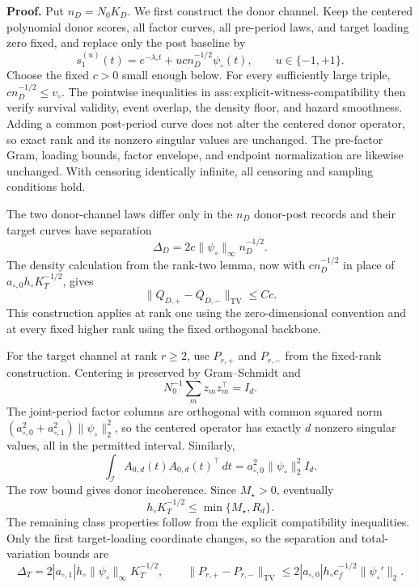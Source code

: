 \textbf{Proof.}
Put \(n_D=N_0K_D\).  We first construct the donor channel.  Keep the centered polynomial donor scores, all factor curves, all pre-period laws, and target loading zero fixed, and replace only the post baseline by
\[
 s_1^{(u)}(t)=e^{-\lambda_\circ t}+ucn_D^{-1/2}\psi_\circ(t),\qquad u\in\{-1,+1\}.
\]
Choose the fixed \(c>0\) small enough below.  For every sufficiently large triple, \(cn_D^{-1/2}\le v_\circ\).  The pointwise inequalities in \(\mathrm{ass:explicit\mbox{-}witness\mbox{-}compatibility}\) then verify survival validity, event overlap, the density floor, and hazard smoothness.  Adding a common post-period curve does not alter the centered donor operator, so exact rank and its nonzero singular values are unchanged.  The pre-factor Gram, loading bounds, factor envelope, and endpoint normalization are likewise unchanged.  With censoring identically infinite, all censoring and sampling conditions hold.

The two donor-channel laws differ only in the \(n_D\) donor-post records and their target curves have separation
\[
 \Delta_D=2c\|\psi_\circ\|_\infty n_D^{-1/2}.
\]
The density calculation from the rank-two lemma, now with \(c n_D^{-1/2}\) in place of \(a_{\circ,0}h_\circ K_T^{-1/2}\), gives
\[
 \|Q_{D,+}-Q_{D,-}\|_{\mathrm{TV}}\le Cc.
\]
This construction applies at rank one using the zero-dimensional convention and at every fixed higher rank using the fixed orthogonal backbone.

For the target channel at rank \(r\ge2\), use \(P_{r,+}\) and \(P_{r,-}\) from the fixed-rank construction.  Centering is preserved by Gram--Schmidt and
\[
 N_0^{-1}\sum_mz_mz_m^\top=I_d.
\]
The joint-period factor columns are orthogonal with common squared norm \((a_{\circ,0}^2+a_{\circ,1}^2)\|\psi_\circ\|_2^2\), so the centered operator has exactly \(d\) nonzero singular values, all in the permitted interval.  Similarly,
\[
 \int_{\mathcal I}A_{0,d}(t)A_{0,d}(t)^\top\,dt
 =a_{\circ,0}^2\|\psi_\circ\|_2^2I_d.
\]
The row bound gives donor incoherence.  Since \(M_\star>0\), eventually
\[
 h_\circ K_T^{-1/2}\le\min\{M_\star,R_d\}.
\]
The remaining class properties follow from the explicit compatibility inequalities.  Only the first target-loading coordinate changes, so the separation and total-variation bounds are
\[
 \Delta_T=2|a_{\circ,1}|h_\circ\|\psi_\circ\|_\infty K_T^{-1/2},
 \qquad
 \|P_{r,+}-P_{r,-}\|_{\mathrm{TV}}
 \le2|a_{\circ,0}|h_\circ c_f^{-1/2}\|\psi_\circ'\|_2.
\]


